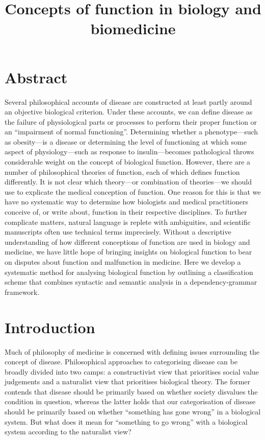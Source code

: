 \documentclass{article}
\title{Concepts of function in biology and biomedicine}
\begin{document}
\maketitle

\section{Abstract}
\label{sec:abstract}

Several philosophical accounts of disease are constructed at least partly around an objective biological criterion. Under these accounts, we can define disease as the failure of physiological parts or processes to perform their proper function or an ``impairment of normal functioning''. Determining whether a phenotype—such as obesity—is a disease or determining the level of functioning at which some aspect of physiology—such as response to insulin—becomes pathological throws considerable weight on the concept of biological function. However, there are a number of philosophical theories of function, each of which defines function differently. It is not clear which theory—or combination of theories—we should use to explicate the medical conception of function. One reason for this is that we have no systematic way to determine how biologists and medical practitioners conceive of, or write about, function in their respective disciplines. To further complicate matters, natural language is replete with ambiguities, and scientific manuscripts often use technical terms imprecisely. Without a descriptive understanding of how different conceptions of function are used in biology and medicine, we have little hope of bringing insights on biological function to bear on disputes about function and malfunction in medicine. Here we develop a systematic method for analysing biological function by outlining a classification scheme that combines syntactic and semantic analysis in a dependency-grammar framework.

\section{Introduction}
\label{sec:introduction}

Much of philosophy of medicine is concerned with defining issues surrounding the concept of disease.
Philosophical approaches to categorising disease can be broadly divided into two camps: a constructivist view that prioritises social value judgements and a naturalist view that prioritises biological theory.
The former contends that disease should be primarily based on whether society disvalues the condition in question, whereas the latter holds that our categorisation of disease should be primarily based on whether ``something has gone wrong'' in a biological system.
But what does it mean for ``something to go wrong'' with a biological system according to the naturalist view?
\end{document}
